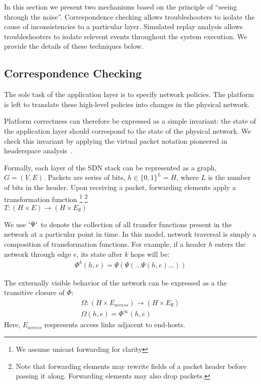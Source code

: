 In this section we present two mechanisms based on the principle of ``seeing
through the noise''. Correspondence checking allows troubleshooters to isolate
the cause of inconsistencies to a particular layer. Simulated replay analysis 
allows troubleshooters to isolate relevent events throughout the system
execution. We provide the details of these techniques below. 

\subsection{Correspondence Checking}

The sole task of the application layer is to specify network
policies. The platform is left to translate these high-level policies
into changes in the physical network.

Platform correctness can therefore be expressed as a simple invariant:
the state of the application layer should correspond to the state of the
physical network. We check this invariant by applying the virtual packet notation pioneered
in headerspace analysis~\cite{hsa}. 

Formally, each layer of the SDN stack can be represented as a graph,
$G = (V, E)$. Packets are series of bits, $h \in \{0,1\}^L = H$,
where $L$ is the number of bits in the header. Upon receiving a packet,
forwarding elements apply a transformation function \footnote{We assume unicast forwarding for clarity}
\footnote{Note that forwarding elements may rewrite fields of a packet header
before passing it along. Forwarding elements may also drop packets.} \\
$T: (H \times E) \rightarrow (H \times E_{\emptyset})$

We use $`\Psi`$ to denote the collection of all transfer functions present in
the network at a particular point in time. In this model, network traversal is simply a composition of transformation
functions. For example, if a header $h$ enters the network through edge
$e$, its state after $k$ hops will be:
\begin{align*}
\Phi^k(h,e) = \Psi(\Psi(\dots \Psi(h,e)\dots))
\end{align*}

The externally visible behavior of the network can be expressed as a the
transitive closure of $\Phi$:
\begin{align*}
\Omega: (H \times E_{access}) \rightarrow (H \times E_{\emptyset}) \\
\Omega(h,e) = \Phi^{\infty}(h,e)
\end{align*}
Here, $E_{access}$ respresents access links adjacent to end-hosts.

